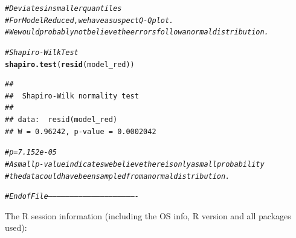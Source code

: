 \documentclass{article}\usepackage[]{graphicx}\usepackage[]{color}
\makeatletter
\newcommand{\hlcom}[1]{\textcolor[rgb]{0.678,0.584,0.686}{\textit{#1}}}%
\newcommand{\hlstd}[1]{\textcolor[rgb]{0.345,0.345,0.345}{#1}}%
\newcommand{\hlkwd}[1]{\textcolor[rgb]{0.737,0.353,0.396}{\textbf{#1}}}%
\newenvironment{kframe}{%
 \def\at@end@of@kframe{}%
 \ifinner\ifhmode%
  \def\at@end@of@kframe{\end{minipage}}%
  \begin{minipage}{\columnwidth}%
 \fi\fi%
 \def\FrameCommand##1{\hskip\@totalleftmargin \hskip-\fboxsep
 \colorbox{shadecolor}{##1}\hskip-\fboxsep
     \hskip-\linewidth \hskip-\@totalleftmargin \hskip\columnwidth}%
 \MakeFramed {\advance\hsize-\width
   \@totalleftmargin\z@ \linewidth\hsize
   \@setminipage}}%
 {\par\unskip\endMakeFramed%
 \at@end@of@kframe}
\newenvironment{knitrout}{}{} %
\makeatother
\begin{document}
\begin{knitrout}
{}


\begin{kframe}\begin{alltt}
\hlcom{# Deviates in smaller quantiles}
\hlcom{# For Model Reduced, we have a suspect Q-Q plot. }
\hlcom{# We would probably not believe the errors follow a normal distribution.}


\hlcom{# Shapiro-Wilk Test}
\hlkwd{shapiro.test}\hlstd{(}\hlkwd{resid}\hlstd{(model_red))}
\end{alltt}
\begin{verbatim}
## 
## 	Shapiro-Wilk normality test
## 
## data:  resid(model_red)
## W = 0.96242, p-value = 0.0002042
\end{verbatim}
\begin{alltt}
\hlcom{# p = 7.152e-05}
\hlcom{# A small p-value indicates we believe there is only a small probability }
\hlcom{# the data could have been sampled from a normal distribution.}

\hlcom{# End of File -------------------------------------------------------------}
\end{alltt}
\end{kframe}
\end{knitrout}

The R session information (including the OS info, R version and all
packages used):
\end{document}
